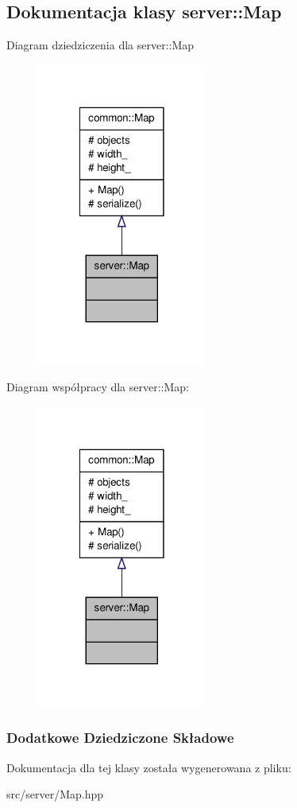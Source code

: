 \hypertarget{classserver_1_1Map}{\subsection{Dokumentacja klasy server\-:\-:Map}
\label{classserver_1_1Map}
}


Diagram dziedziczenia dla server\-:\-:Map
\nopagebreak
\begin{figure}[H]
\begin{center}
\leavevmode
\includegraphics[width=158pt]{classserver_1_1Map__inherit__graph}
\end{center}
\end{figure}


Diagram współpracy dla server\-:\-:Map\-:
\nopagebreak
\begin{figure}[H]
\begin{center}
\leavevmode
\includegraphics[width=158pt]{classserver_1_1Map__coll__graph}
\end{center}
\end{figure}
\subsubsection*{Dodatkowe Dziedziczone Składowe}


Dokumentacja dla tej klasy została wygenerowana z pliku\-:\begin{DoxyCompactItemize}
\item 
src/server/Map.\-hpp\end{DoxyCompactItemize}
